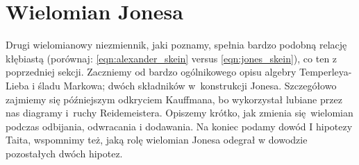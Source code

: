 
\section{Wielomian Jonesa}
%
Drugi wielomianowy niezmiennik, jaki poznamy, spełnia bardzo podobną relację kłębiastą (porównaj: \ref{eqn:alexander_skein} versus \ref{eqn:jones_skein}), co ten z poprzedniej sekcji.
Zaczniemy od bardzo ogólnikowego opisu algebry Temperleya-Lieba i śladu Markowa; dwóch składników w~konstrukcji Jonesa.
Szczegółowo zajmiemy się późniejszym odkryciem Kauffmana, bo wykorzystał lubiane przez nas diagramy i~ruchy Reidemeistera.
Opiszemy krótko, jak zmienia się wielomian podczas odbijania, odwracania i dodawania.
Na koniec podamy dowód I hipotezy Taita, wspomnimy też, jaką rolę wielomian Jonesa odegrał w dowodzie pozostałych dwóch hipotez.













%



